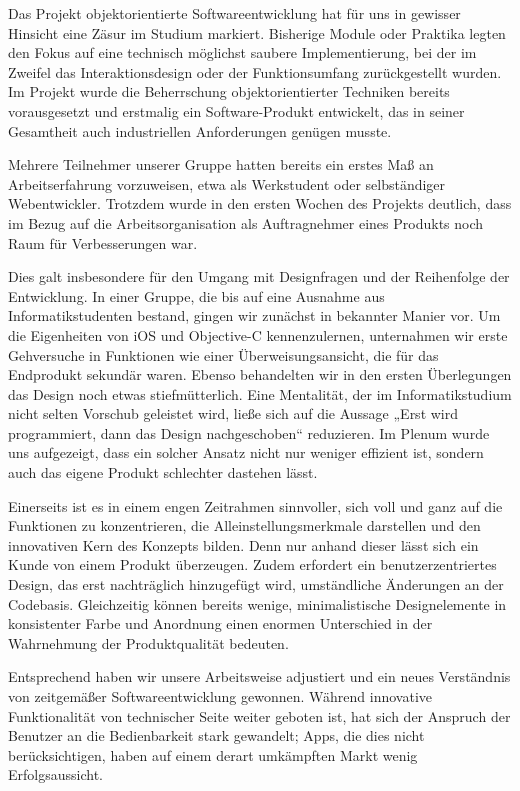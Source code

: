 	Das Projekt objektorientierte Softwareentwicklung hat für uns in gewisser Hinsicht eine Zäsur im Studium markiert. Bisherige Module oder Praktika legten den Fokus auf eine technisch möglichst saubere Implementierung, bei der im Zweifel das Interaktionsdesign oder der Funktionsumfang zurückgestellt wurden. Im Projekt wurde die Beherrschung objektorientierter Techniken bereits vorausgesetzt und erstmalig ein Software-Produkt entwickelt, das in seiner Gesamtheit auch industriellen Anforderungen genügen musste. 

	Mehrere Teilnehmer unserer Gruppe hatten bereits ein erstes Maß an Arbeitserfahrung vorzuweisen, etwa als Werkstudent oder selbständiger Webentwickler. Trotzdem wurde in den ersten Wochen des Projekts deutlich, dass im Bezug auf die Arbeitsorganisation als Auftragnehmer eines Produkts noch Raum für Verbesserungen war. 

	Dies galt insbesondere für den Umgang mit Designfragen und der Reihenfolge der Entwicklung. In einer Gruppe, die bis auf eine Ausnahme aus Informatikstudenten bestand, gingen wir zunächst in bekannter Manier vor. Um die Eigenheiten von iOS und Objective-C kennenzulernen, unternahmen wir erste Gehversuche in Funktionen wie einer Überweisungsansicht, die für das Endprodukt sekundär waren. Ebenso behandelten wir in den ersten Überlegungen das Design noch etwas stiefmütterlich. Eine Mentalität, der im Informatikstudium nicht selten Vorschub geleistet wird, ließe sich auf die Aussage „Erst wird programmiert, dann das Design nachgeschoben“ reduzieren. Im Plenum wurde uns aufgezeigt, dass ein solcher Ansatz nicht nur weniger effizient ist, sondern auch das eigene Produkt schlechter dastehen lässt. 

	Einerseits ist es in einem engen Zeitrahmen sinnvoller, sich voll und ganz auf die Funktionen zu konzentrieren, die Alleinstellungsmerkmale darstellen und den innovativen Kern des Konzepts bilden. Denn nur anhand dieser lässt sich ein Kunde von einem Produkt überzeugen. Zudem erfordert ein benutzerzentriertes Design, das erst nachträglich hinzugefügt wird, umständliche Änderungen an der Codebasis. Gleichzeitig können bereits wenige, minimalistische Designelemente in konsistenter Farbe und Anordnung einen enormen Unterschied in der Wahrnehmung der Produktqualität bedeuten.

	Entsprechend haben wir unsere Arbeitsweise adjustiert und ein neues Verständnis von zeitgemäßer Softwareentwicklung gewonnen. Während innovative Funktionalität von technischer Seite weiter geboten ist, hat sich der Anspruch der Benutzer an die Bedienbarkeit stark gewandelt; Apps, die dies nicht berücksichtigen, haben auf einem derart umkämpften Markt wenig Erfolgsaussicht.

